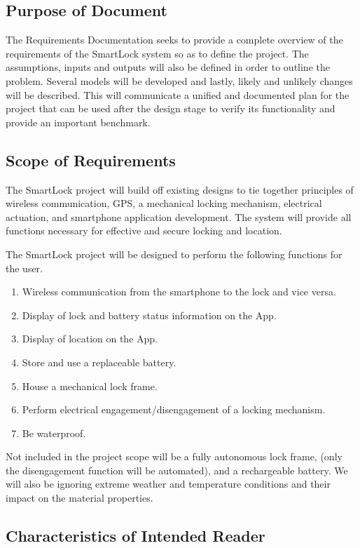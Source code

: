 \documentclass[12pt]{article}
\begin{document}
\subsection{Purpose of Document}

The Requirements Documentation seeks to provide a complete overview of the requirements of the SmartLock system so as to define the project. The assumptions, inputs and outputs will also be defined in order to outline the problem. Several models will be developed and lastly, likely and unlikely changes will be described. This will communicate a unified and documented plan for the project that can be used after the design stage to verify its functionality and provide an important benchmark. 

\subsection{Scope of Requirements} 

The SmartLock project will build off existing designs to tie together principles of wireless communication, GPS, a mechanical locking mechanism, electrical actuation, and smartphone application development. The system will provide all functions necessary for effective and secure locking and location.  

The SmartLock project will be designed to perform the following functions for the user.  

\begin{enumerate}
\item Wireless communication from the smartphone to the lock and vice versa. 
\item Display of lock and battery status information on the App. 
\item Display of location on the App. 
\item Store and use a replaceable battery. 
\item House a mechanical lock frame. 
\item Perform electrical engagement/disengagement of a locking mechanism. 
\item Be waterproof. 
\end{enumerate}

Not included in the project scope will be a fully autonomous lock frame, (only the disengagement function will be automated), and a rechargeable battery. We will also be ignoring extreme weather and temperature conditions and their impact on the material properties.

\subsection{Characteristics of Intended Reader} \label{sec_IntendedReader}
\end{document}
